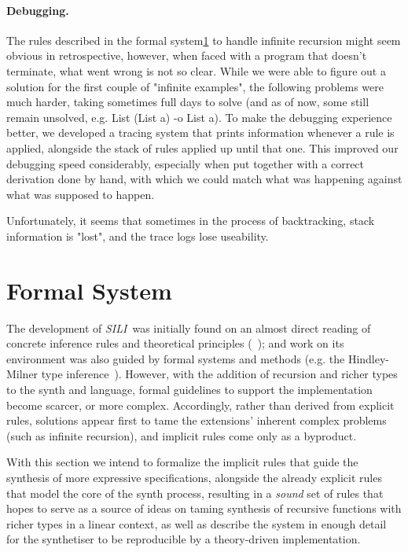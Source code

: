 \documentclass{llncs}
\newcommand{\mypara}[1]{\paragraph{\textbf{#1}.}}
\newcommand{\synname}{\emph{SILI}}
\begin{document}
\mypara{Debugging} The rules described in the formal
system\ref{sec:formal_system} to handle infinite recursion might seem obvious in
retrospective, however, when faced with a program that doesn't terminate, what
went wrong is not so clear. While we were able to figure out a solution for the
first couple of "infinite examples", the following problems were much harder,
taking sometimes full days to solve (and as of now, some still remain unsolved,
e.g. List (List a) -o List a). To make the debugging experience better, we
developed a tracing system that prints information whenever a rule is applied,
alongside the stack of rules applied up until that one. This improved our
debugging speed considerably, especially when put together with a correct
derivation done by hand, with which we could match what was happening against
what was supposed to happen.

Unfortunately, it seems that sometimes in the process of backtracking, stack
information is "lost", and the trace logs lose useability.



\section{Formal System}\label{sec:formal_system}

The development of \synname\ was initially found on an almost direct reading of
concrete inference rules and theoretical principles (~\cite{frank pfenning notes}); and work on its environment
was also guided by formal systems and methods (e.g. the Hindley-Milner type
inference~\cite{}).  However, with the addition of recursion and richer types to
the synth and language, formal guidelines to support the implementation become
scarcer, or more complex. Accordingly, rather than derived from explicit rules,
solutions appear first to tame the extensions' inherent complex problems (such
as infinite recursion), and implicit rules come only as a byproduct.

With this section we intend to formalize the implicit rules that guide the
synthesis of more expressive specifications, alongside the already explicit
rules that model the core of the synth process, resulting in a \emph{sound} set
of rules that hopes to serve as a source of ideas on taming synthesis of
recursive functions with richer types in a linear context, as well as describe
the system in enough detail for the synthetiser to be reproducible by a
theory-driven implementation.
\end{document}
